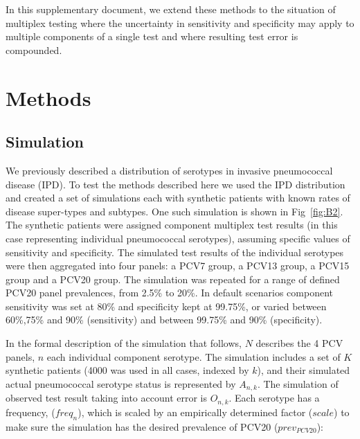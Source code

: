 \documentclass[a4paper, 12pt, twoside]{article}
\let\Oldsection\section
\renewcommand{\section}{\FloatBarrier\Oldsection}
\let\Oldsubsection\subsection
\renewcommand{\subsection}{\FloatBarrier\Oldsubsection}
\begin{document}
In this supplementary document, we extend these methods to the situation of multiplex testing where the uncertainty in sensitivity and specificity may apply to multiple components of a single test and where resulting test error is compounded.

\section{Methods}
\subsection{Simulation}

We previously described a distribution of serotypes in invasive pneumococcal disease (IPD)\cite{hyams2023}. To test the methods described here we used the IPD distribution and created a set of simulations each with synthetic patients with known rates of disease super-types and subtypes. One such simulation is shown in Fig~\ref{fig:B2}. The synthetic patients were assigned component multiplex test results (in this case representing individual pneumococcal serotypes), assuming specific values of sensitivity and specificity. The simulated test results of the individual serotypes were then aggregated into four panels: a PCV7 group, a PCV13 group, a PCV15 group and a PCV20 group. The simulation was repeated for a range of defined PCV20 panel prevalences, from 2.5\% to 20\%. In default scenarios component sensitivity was set at 80\% and specificity kept at 99.75\%, or varied between 60\%,75\% and 90\% (sensitivity) and between 99.75\% and 90\% (specificity).

In the formal description of the simulation that follows, \(N\) describes the 4 PCV panels, \(n\) each individual component serotype. The simulation includes a set of \(K\) synthetic patients (4000 was used in all cases, indexed by \(k\)), and their simulated actual pneumococcal serotype status is represented by \(A_{n,k}\). The simulation of observed test result taking into account error is \(O_{n,k}\). Each serotype has a frequency, (\(freq_n\)), which is scaled by an empirically determined factor (\(scale\)) to make sure the simulation has the desired prevalence of PCV20 (\(prev_{PCV20}\)):
\end{document}
